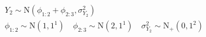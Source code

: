 \begin{equation}
\begin{gathered}
  Y_{2} \sim \text{N}(\phi_{1:2} + \phi_{2:3}, \sigma^{2}_{Y_{2}}) \\
  \phi_{1:2} \sim \text{N}(1, 1^1) \quad
  \phi_{2:3} \sim \text{N}(2, 1^1) \quad
  \sigma^{2}_{Y_{2}} \sim \text{N}_{+}(0, 1^2)
  \label{eqn:model-2-specification}  
\end{gathered}
\end{equation}